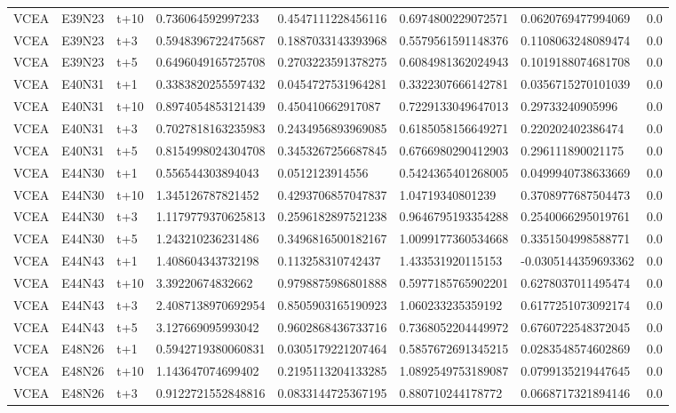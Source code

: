 \begin{landscape}
\begin{longtable}{llllllll}
VCEA & E39N23 & t+10 & 0.736064592997233 & 0.4547111228456116 & 0.6974800229072571 & 0.0620769477994069 & 0.0 \\
VCEA & E39N23 & t+3 & 0.5948396722475687 & 0.1887033143393968 & 0.5579561591148376 & 0.1108063248089474 & 0.0 \\
VCEA & E39N23 & t+5 & 0.6496049165725708 & 0.2703223591378275 & 0.6084981362024943 & 0.1019188074681708 & 0.0 \\
VCEA & E40N31 & t+1 & 0.3383820255597432 & 0.0454727531964281 & 0.3322307666142781 & 0.0356715270101039 & 0.0 \\
VCEA & E40N31 & t+10 & 0.8974054853121439 & 0.450410662917087 & 0.7229133049647013 & 0.29733240905996 & 0.0 \\
VCEA & E40N31 & t+3 & 0.7027818163235983 & 0.2434956893969085 & 0.6185058156649271 & 0.220202402386474 & 0.0 \\
VCEA & E40N31 & t+5 & 0.8154998024304708 & 0.3453267256687845 & 0.6766980290412903 & 0.296111890021175 & 0.0 \\
VCEA & E44N30 & t+1 & 0.556544303894043 & 0.0512123914556 & 0.5424365401268005 & 0.0499940738633669 & 0.0 \\
VCEA & E44N30 & t+10 & 1.345126787821452 & 0.4293706857047837 & 1.04719340801239 & 0.3708977687504473 & 0.0 \\
VCEA & E44N30 & t+3 & 1.1179779370625813 & 0.2596182897521238 & 0.9646795193354288 & 0.2540066295019761 & 0.0 \\
VCEA & E44N30 & t+5 & 1.243210236231486 & 0.3496816500182167 & 1.0099177360534668 & 0.3351504998588771 & 0.0 \\
VCEA & E44N43 & t+1 & 1.408604343732198 & 0.113258310742437 & 1.433531920115153 & -0.0305144359693362 & 0.0 \\
VCEA & E44N43 & t+10 & 3.39220674832662 & 0.9798875986801888 & 0.5977185765902201 & 0.6278037011495474 & 0.0 \\
VCEA & E44N43 & t+3 & 2.4087138970692954 & 0.8505903165190923 & 1.060233235359192 & 0.6177251073092174 & 0.0 \\
VCEA & E44N43 & t+5 & 3.127669095993042 & 0.9602868436733716 & 0.7368052204449972 & 0.6760722548372045 & 0.0 \\
VCEA & E48N26 & t+1 & 0.5942719380060831 & 0.0305179221207464 & 0.5857672691345215 & 0.0283548574602869 & 0.0 \\
VCEA & E48N26 & t+10 & 1.143647074699402 & 0.2195113204133285 & 1.0892549753189087 & 0.0799135219447645 & 0.0 \\
VCEA & E48N26 & t+3 & 0.9122721552848816 & 0.0833144725367195 & 0.880710244178772 & 0.0668717321894146 & 0.0 \\

\end{longtable}
\end{landscape}
